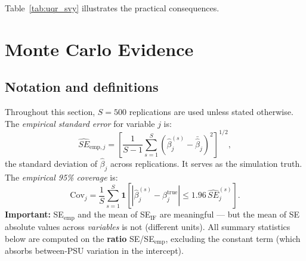 \documentclass[12pt,a4paper]{article}
\theoremstyle{definition}
\begin{document}
Table~\ref{tab:uqr_svy} illustrates the practical consequences.

\begin{table}[htbp]\centering\small
\caption{UQR vs PWR under survey design, Burkina Faso, $\tau=0.5$}
\label{tab:uqr_svy}
\end{table}

\section{Monte Carlo Evidence}
\label{sec:mc}

\subsection{Notation and definitions}

Throughout this section, $S=500$ replications are used unless stated
otherwise. The \emph{empirical standard error} for variable $j$ is:
\begin{equation}
  \widehat{SE}_{\mathrm{emp},j}
  = \left[\frac{1}{S-1}\sum_{s=1}^S
    \left(\hat\beta_j^{(s)} - \bar{\hat\beta}_j\right)^2
    \right]^{1/2},
\end{equation}
the standard deviation of $\hat\beta_j$ across replications. It
serves as the simulation truth. The \emph{empirical 95\% coverage} is:
\begin{equation}
  \mathrm{Cov}_j = \frac{1}{S}\sum_{s=1}^S
  \mathbf{1}\!\left[
    \left|\hat\beta_j^{(s)} - \beta_j^{\mathrm{true}}\right|
    \leq 1.96\,\widehat{SE}_j^{(s)}
  \right].
\end{equation}
\textbf{Important:} SE$_{\mathrm{emp}}$ and the mean of SE$_{\mathrm{IF}}$
are meaningful --- but the mean of SE absolute values across
\textit{variables} is not (different units). All summary statistics
below are computed on the \textbf{ratio} SE/SE$_{\mathrm{emp}}$,
excluding the constant term (which absorbs between-PSU variation in
the intercept).
\end{document}
